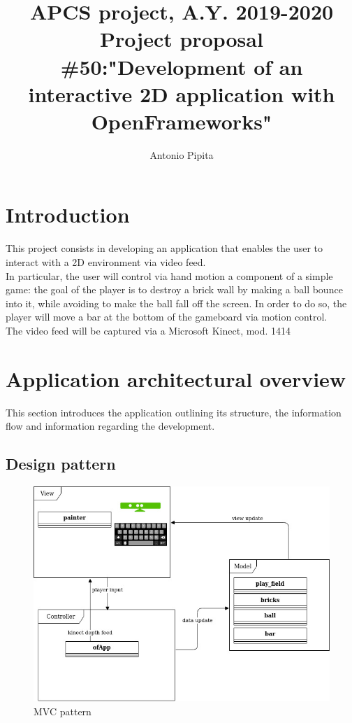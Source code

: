 \documentclass[]{article}
\title{ APCS project, A.Y. 2019-2020\\Project proposal \#50:"Development of an interactive 2D application with  OpenFrameworks"}
\author{Antonio Pipita}
\begin{document}
\maketitle
\newpage
\tableofcontents
\newpage
\section{Introduction}
This project consists in developing an application that enables the user to interact with a 2D environment via video feed.\\
In particular, the user will control via hand motion a component of a simple game: the goal of the player is to destroy a brick wall by making a ball bounce into it, while avoiding to make the ball fall off the screen. In order to do so, the player will move a bar at the bottom of the gameboard via motion control.\\
The video feed will be captured via a Microsoft Kinect, mod. 1414\\
\section{Application architectural overview}
This section introduces the application outlining its structure, the information flow and information regarding the development.
\subsection{Design pattern}
\begin{figure}[h!]
    \centering
    \includegraphics[width=\textwidth]{MVC_mod.jpg}
    \caption{MVC pattern}
    \label{fig:MVC}
\end{figure}
\end{document}
